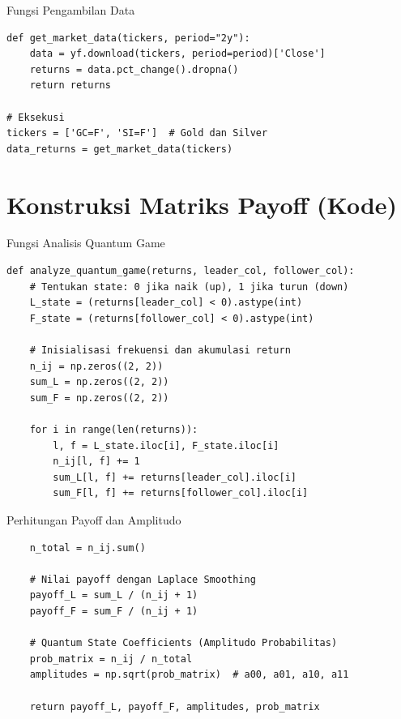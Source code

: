 \documentclass[aspectratio=169]{beamer}
\begin{document}
\begin{frame}[fragile]{Fungsi Pengambilan Data}
\begin{lstlisting}
def get_market_data(tickers, period="2y"):
    data = yf.download(tickers, period=period)['Close']
    returns = data.pct_change().dropna()
    return returns

# Eksekusi
tickers = ['GC=F', 'SI=F']  # Gold dan Silver
data_returns = get_market_data(tickers)
\end{lstlisting}
\end{frame}

\section{Konstruksi Matriks Payoff (Kode)}

\begin{frame}[fragile]{Fungsi Analisis Quantum Game}
\begin{lstlisting}
def analyze_quantum_game(returns, leader_col, follower_col):
    # Tentukan state: 0 jika naik (up), 1 jika turun (down)
    L_state = (returns[leader_col] < 0).astype(int)
    F_state = (returns[follower_col] < 0).astype(int)
    
    # Inisialisasi frekuensi dan akumulasi return
    n_ij = np.zeros((2, 2))
    sum_L = np.zeros((2, 2))
    sum_F = np.zeros((2, 2))
    
    for i in range(len(returns)):
        l, f = L_state.iloc[i], F_state.iloc[i]
        n_ij[l, f] += 1
        sum_L[l, f] += returns[leader_col].iloc[i]
        sum_F[l, f] += returns[follower_col].iloc[i]
\end{lstlisting}
\end{frame}

\begin{frame}[fragile]{Perhitungan Payoff dan Amplitudo}
\begin{lstlisting}
    n_total = n_ij.sum()
    
    # Nilai payoff dengan Laplace Smoothing
    payoff_L = sum_L / (n_ij + 1)
    payoff_F = sum_F / (n_ij + 1)
    
    # Quantum State Coefficients (Amplitudo Probabilitas)
    prob_matrix = n_ij / n_total
    amplitudes = np.sqrt(prob_matrix)  # a00, a01, a10, a11
    
    return payoff_L, payoff_F, amplitudes, prob_matrix
\end{lstlisting}
\end{frame}
\end{document}
